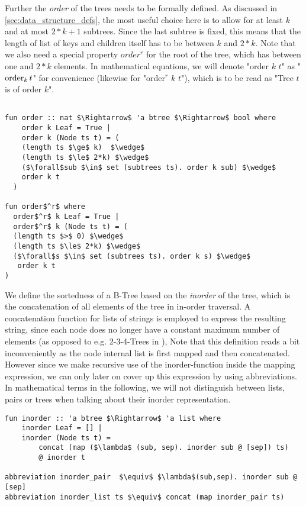 Further the \textit{order} of the trees needs to be formally defined.
As discussed in \autoref{sec:data_structure_defs}, the most useful choice here is
to allow for at least $k$ and at most $2*k+1$ subtrees.
Since the last subtree is fixed, this means that the length of list of keys and children
itself has to be between $k$ and $2*k$.
Note that we also need a special property $order^r$ for the root of the tree,
which has between one and $2*k$ elements.
In mathematical equations, we will denote "order $k$ $t$" as "$\operatorname{order}_k t$"
for convenience (likewise for "order$^r$ $k$ $t$"), which is to be read as
"Tree $t$ is of order $k$".

\begin{lstlisting}[mathescape=true, language=Isabelle]

fun order :: nat $\Rightarrow$ 'a btree $\Rightarrow$ bool where
    order k Leaf = True |
    order k (Node ts t) = (
    (length ts $\ge$ k)  $\wedge$
    (length ts $\le$ 2*k) $\wedge$
    ($\forall$sub $\in$ set (subtrees ts). order k sub) $\wedge$
    order k t
  )

fun order$^r$ where
  order$^r$ k Leaf = True |
  order$^r$ k (Node ts t) = (
  (length ts $>$ 0) $\wedge$
  (length ts $\le$ 2*k) $\wedge$
  ($\forall$s $\in$ set (subtrees ts). order k s) $\wedge$
   order k t
)

\end{lstlisting}

We define the sortedness of a B-Tree based on the \textit{inorder} of the tree,
which is the concatenation of all elements of the tree in in-order traversal.
A concatenation function for lists of strings
is employed to express the resulting string,
since each node does no longer have a constant maximum number of elements (as opposed to
e.g. 2-3-4-Trees in \parencite{DBLP:conf/itp/Nipkow16}),
Note that this definition reads a bit inconveniently
as the node internal list is first mapped and then concatenated.
However since we make recursive use of the inorder-function
inside the mapping expression, we can only later on cover up this expression
by using abbreviations.
In mathematical terms in the following, we will not distinguish between lists, 
pairs or trees when talking about their inorder representation.

\begin{lstlisting}[mathescape=true, language=Isabelle]
fun inorder :: 'a btree $\Rightarrow$ 'a list where
    inorder Leaf = [] |
    inorder (Node ts t) = 
        concat (map ($\lambda$ (sub, sep). inorder sub @ [sep]) ts)
        @ inorder t

abbreviation inorder_pair  $\equiv$ $\lambda$(sub,sep). inorder sub @ [sep]
abbreviation inorder_list ts $\equiv$ concat (map inorder_pair ts)
\end{lstlisting}

